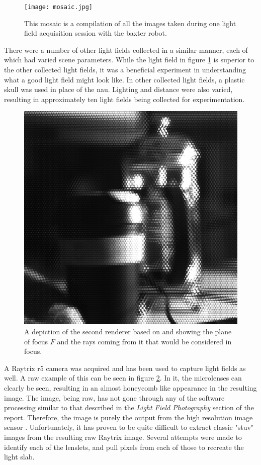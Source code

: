 \documentclass[12pt]{report}
\begin{document}
\begin{figure}[!ht]
	\centering
	\texttt{[image: mosaic.jpg]}
	\caption{This mosaic is a compilation of all the images taken during one light field acquisition session with the baxter robot.}
	\label{fig:nau_collected_images}
\end{figure}
There were a number of other light fields collected in a similar manner, each of which had varied scene parameters. While the light field in figure \ref{fig:nau_collected_images} is superior to the other collected light fields, it was a beneficial experiment in understanding what a good light field might look like. In other collected light fields, a plastic skull was used in place of the nau. Lighting and distance were also varied, resulting in approximately ten light fields being collected for experimentation. 

\begin{figure}[!ht]
	\centering
	\includegraphics[scale=0.2]{raytrix_raw.png}
	\caption{A depiction of the second renderer based on \cite{Isaksen01} and showing the plane of focus $F$ and the rays coming from it that would be considered in focus.}
	\label{fig:raytrix_raw}
\end{figure}
A Raytrix r5 camera was acquired and has been used to capture light fields as well. A raw example of this can be seen in figure \ref{fig:raytrix_raw}. In it, the microlenses can clearly be seen, resulting in an almost honeycomb like appearance in the resulting image. The image, being raw, has not gone through any of the software processing similar to that described in the \emph{Light Field Photography} section of the report. Therefore, the image is purely the output from the high resolution image sensor \cite{Perwass12}. Unfortunately, it has proven to be quite difficult to extract classic "stuv" images from the resulting raw Raytrix image. Several attempts were made to identify each of the lenslets, and pull pixels from each of those to recreate the light slab.
\end{document}
